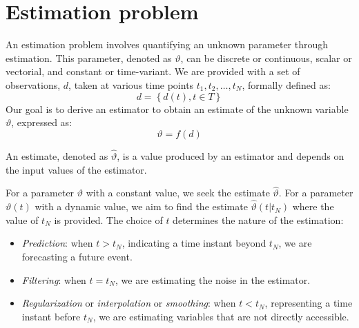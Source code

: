 \section{Estimation problem}

An estimation problem involves quantifying an unknown parameter through estimation. 
This parameter, denoted as $\vartheta$, can be discrete or continuous, scalar or vectorial, and constant or time-variant.
We are provided with a set of observations, $d$, taken at various time points $t_1, t_2, \dots, t_N$, formally defined as: 
\[d=\left\{ d(t), t \in T\right\}\]
Our goal is to derive an estimator to obtain an estimate of the unknown variable $\vartheta$, expressed as:
\[\vartheta=f(d)\]
\begin{definition}
    An estimate, denoted as $\widehat{\vartheta}$, is a value produced by an estimator and depends on the input values of the estimator.
\end{definition}
For a parameter $\vartheta$ with a constant value, we seek the estimate $\widehat{\vartheta}$. 
For a parameter $\vartheta(t)$ with a dynamic value, we aim to find the estimate $\widehat{\vartheta}(t | t_N)$ where the value of $t_N$ is provided.
The choice of $t$ determines the nature of the estimation:
\begin{itemize}
    \item \textit{Prediction}: when $t > t_N$, indicating a time instant beyond $t_N$, we are forecasting a future event.
    \item \textit{Filtering}: when $t = t_N$, we are estimating the noise in the estimator. 
    \item \textit{Regularization} or \textit{interpolation} or \textit{smoothing}: when $t < t_N$, representing a time instant before $t_N$, we are estimating variables that are not directly accessible.
\end{itemize}